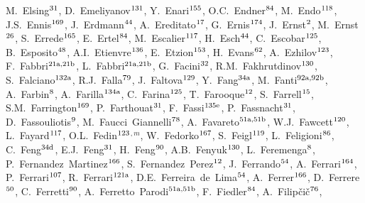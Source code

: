 \begin{flushleft}
M.~Elsing$^\textrm{\scriptsize 31}$,
D.~Emeliyanov$^\textrm{\scriptsize 131}$,
Y.~Enari$^\textrm{\scriptsize 155}$,
O.C.~Endner$^\textrm{\scriptsize 84}$,
M.~Endo$^\textrm{\scriptsize 118}$,
J.S.~Ennis$^\textrm{\scriptsize 169}$,
J.~Erdmann$^\textrm{\scriptsize 44}$,
A.~Ereditato$^\textrm{\scriptsize 17}$,
G.~Ernis$^\textrm{\scriptsize 174}$,
J.~Ernst$^\textrm{\scriptsize 2}$,
M.~Ernst$^\textrm{\scriptsize 26}$,
S.~Errede$^\textrm{\scriptsize 165}$,
E.~Ertel$^\textrm{\scriptsize 84}$,
M.~Escalier$^\textrm{\scriptsize 117}$,
H.~Esch$^\textrm{\scriptsize 44}$,
C.~Escobar$^\textrm{\scriptsize 125}$,
B.~Esposito$^\textrm{\scriptsize 48}$,
A.I.~Etienvre$^\textrm{\scriptsize 136}$,
E.~Etzion$^\textrm{\scriptsize 153}$,
H.~Evans$^\textrm{\scriptsize 62}$,
A.~Ezhilov$^\textrm{\scriptsize 123}$,
F.~Fabbri$^\textrm{\scriptsize 21a,21b}$,
L.~Fabbri$^\textrm{\scriptsize 21a,21b}$,
G.~Facini$^\textrm{\scriptsize 32}$,
R.M.~Fakhrutdinov$^\textrm{\scriptsize 130}$,
S.~Falciano$^\textrm{\scriptsize 132a}$,
R.J.~Falla$^\textrm{\scriptsize 79}$,
J.~Faltova$^\textrm{\scriptsize 129}$,
Y.~Fang$^\textrm{\scriptsize 34a}$,
M.~Fanti$^\textrm{\scriptsize 92a,92b}$,
A.~Farbin$^\textrm{\scriptsize 8}$,
A.~Farilla$^\textrm{\scriptsize 134a}$,
C.~Farina$^\textrm{\scriptsize 125}$,
T.~Farooque$^\textrm{\scriptsize 12}$,
S.~Farrell$^\textrm{\scriptsize 15}$,
S.M.~Farrington$^\textrm{\scriptsize 169}$,
P.~Farthouat$^\textrm{\scriptsize 31}$,
F.~Fassi$^\textrm{\scriptsize 135e}$,
P.~Fassnacht$^\textrm{\scriptsize 31}$,
D.~Fassouliotis$^\textrm{\scriptsize 9}$,
M.~Faucci~Giannelli$^\textrm{\scriptsize 78}$,
A.~Favareto$^\textrm{\scriptsize 51a,51b}$,
W.J.~Fawcett$^\textrm{\scriptsize 120}$,
L.~Fayard$^\textrm{\scriptsize 117}$,
O.L.~Fedin$^\textrm{\scriptsize 123}$$^{,m}$,
W.~Fedorko$^\textrm{\scriptsize 167}$,
S.~Feigl$^\textrm{\scriptsize 119}$,
L.~Feligioni$^\textrm{\scriptsize 86}$,
C.~Feng$^\textrm{\scriptsize 34d}$,
E.J.~Feng$^\textrm{\scriptsize 31}$,
H.~Feng$^\textrm{\scriptsize 90}$,
A.B.~Fenyuk$^\textrm{\scriptsize 130}$,
L.~Feremenga$^\textrm{\scriptsize 8}$,
P.~Fernandez~Martinez$^\textrm{\scriptsize 166}$,
S.~Fernandez~Perez$^\textrm{\scriptsize 12}$,
J.~Ferrando$^\textrm{\scriptsize 54}$,
A.~Ferrari$^\textrm{\scriptsize 164}$,
P.~Ferrari$^\textrm{\scriptsize 107}$,
R.~Ferrari$^\textrm{\scriptsize 121a}$,
D.E.~Ferreira~de~Lima$^\textrm{\scriptsize 54}$,
A.~Ferrer$^\textrm{\scriptsize 166}$,
D.~Ferrere$^\textrm{\scriptsize 50}$,
C.~Ferretti$^\textrm{\scriptsize 90}$,
A.~Ferretto~Parodi$^\textrm{\scriptsize 51a,51b}$,
F.~Fiedler$^\textrm{\scriptsize 84}$,
A.~Filip\v{c}i\v{c}$^\textrm{\scriptsize 76}$,
$$
\end{flushleft}

